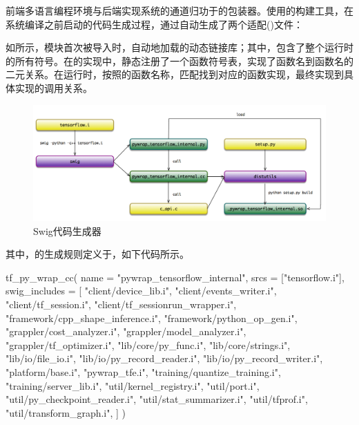 \begin{content}

前端多语言编程环境与后端\cpp{}实现系统的通道归功于的包装器。使用的构建工具，在系统编译之前启动的代码生成过程，通过自动生成了两个适配()文件：

\begin{enum}
\end{enum}

如所示，模块首次被导入时，自动地加载的动态链接库；其中，包含了整个\tf{}运行时的所有符号。在的实现中，静态注册了一个函数符号表，实现了函数名到函数名的二元关系。在运行时，按照的函数名称，匹配找到对应的函数实现，最终实现到具体实现的调用关系。

\begin{figure}[H]
\centering
\includegraphics[width=1.0\textwidth]{figures/swig.png}
\caption{Swig代码生成器}
 \label{fig:swig}
\end{figure}

其中，的生成规则定义于，如下代码所示。

\begin{leftbar}
\begin{python}
tf_py_wrap_cc(
    name = "pywrap_tensorflow_internal",
    srcs = ["tensorflow.i"],
    swig_includes = [
        "client/device_lib.i",
        "client/events_writer.i",
        "client/tf_session.i",
        "client/tf_sessionrun_wrapper.i",
        "framework/cpp_shape_inference.i",
        "framework/python_op_gen.i",
        "grappler/cost_analyzer.i",
        "grappler/model_analyzer.i",
        "grappler/tf_optimizer.i",
        "lib/core/py_func.i",
        "lib/core/strings.i",
        "lib/io/file_io.i",
        "lib/io/py_record_reader.i",
        "lib/io/py_record_writer.i",
        "platform/base.i",
        "pywrap_tfe.i",
        "training/quantize_training.i",
        "training/server_lib.i",
        "util/kernel_registry.i",
        "util/port.i",
        "util/py_checkpoint_reader.i",
        "util/stat_summarizer.i",
        "util/tfprof.i",
        "util/transform_graph.i",
    ]
)
\end{python}
\end{leftbar}


\end{content}
